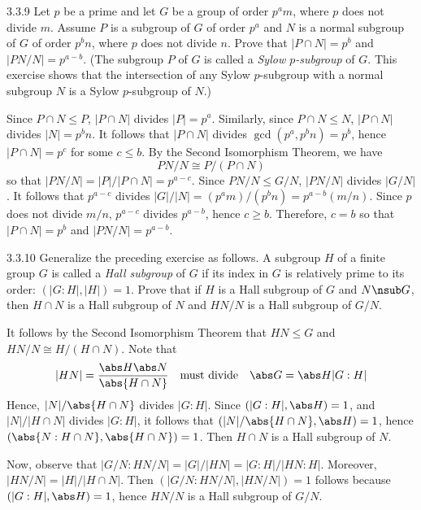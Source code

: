 \begin{spex}{3.3.9}
    Let $p$ be a prime and let $G$ be a group of order $p^am$, where $p$ does not divide $m$.
	Assume $P$ is a subgroup of $G$ of order $p^a$ and $N$ is a normal subgroup of $G$ of order $p^b n$, where $p$ does not divide $n$.
	Prove that $|P \cap N| = p^b$ and $|PN/N| = p^{a - b}$. (The subgroup $P$ of $G$ is called a \emph{Sylow $p$-subgroup} of $G$.
	This exercise shows that the intersection of any Sylow $p$-subgroup with a normal subgroup $N$ is a Sylow $p$-subgroup of $N$.)
\end{spex}

\begin{sol}[spsol]
    Since $P \cap N \leq P$, $|P \cap N|$ divides $|P| = p^a$.
	Similarly, since $P \cap N \leq N$, $|P \cap N|$ divides $|N| = p^b n$.
	It follows that $|P \cap N|$ divides $\gcd(p^a, p^b n) = p^b$, hence $|P \cap N| = p^c$ for some $c \leq b$.
	By the Second Isomorphism Theorem, we have
    \[
    	PN/N \cong P/(P \cap N)
    \]
    so that $|PN/N| = |P|/|P \cap N| = p^{a - c}$.
	Since $PN/N \leq G/N$, $|PN/N|$ divides $|G/N|$.
	It follows that $p^{a - c}$ divides $|G|/|N| = (p^a m)/(p^b n) = p^{a - b}(m/n)$.
	Since $p$ does not divide $m/n$, $p^{a - c}$ divides $p^{a - b}$, hence $c \geq b$.
	Therefore, $c = b$ so that $|P \cap N| = p^b$ and $|PN/N| = p^{a - b}$.
\end{sol}

\begin{exercise}{3.3.10}
    Generalize the preceding exercise as follows.
	A subgroup $H$ of a finite group $G$ is called a \emph{Hall subgroup} of $G$ if its index in $G$ is relatively prime to its order: $(|G : H|, |H|) = 1$.
	Prove that if $H$ is a Hall subgroup of $G$ and $N \nsub G$, then $H \cap N$ is a Hall subgroup of $N$ and $HN/N$ is a Hall subgroup of $G/N$.
\end{exercise}

\begin{sol}
    It follows by the Second Isomorphism Theorem that $HN \leq G$ and $HN/N \cong H/(H \cap N)$.
	Note that
    \[
    	|HN| = \frac{\abs H \abs N}{\abs{H \cap N}} \quad \text{must divide} \quad \abs G = \abs H |G : H|
    \]
    Hence, $|N|/\abs{H \cap N}$ divides $|G : H|$.
	Since $(|G : H|, \abs H) = 1$, and $|N|/|H \cap N|$ divides $|G : H|$, it follows that $(|N|/\abs{H \cap N}, \abs H) = 1$, hence $(\abs{N : H \cap N}, \abs{H \cap N}) = 1$.
	Then $H \cap N$ is a Hall subgroup of $N$.

    Now, observe that $|G/N : HN/N| = |G|/|HN| = |G:H|/|HN : H|$.
	Moreover, $|HN/N| = |H|/|H \cap N|$.
	Then $(|G/N : HN/N|, |HN/N|) = 1$ follows because $(|G : H|, \abs H) = 1$, hence $HN/N$ is a Hall subgroup of $G/N$.
\end{sol}